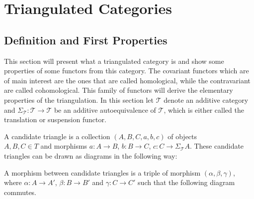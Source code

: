\chapter{Triangulated Categories}

\section{Definition and First Properties}
    This section will present what a triangulated category is and show some properties of some functors from this category. The covariant functors which are of main interest are the ones that are called homological, while the contravariant are called cohomological. This family of functors will derive the elementary properties of the triangulation. In this section let $\mathcal{T}$ denote an additive category and $\Sigma_{\mathcal{T}}:\mathcal{T}\rightarrow\mathcal{T}$ be an additive autoequivalence of $\mathcal{T}$, which is either called the translation or suspension functor.
    
    \begin{definition}
        A candidate triangle is a collection $(A,B,C,a,b,c)$ of objects \\ $A,B,C\in T$ and morphisms $a:A\rightarrow B$, $b:B\rightarrow C$, $c:C\rightarrow \Sigma_{\mathcal{T}}A$. These candidate triangles can be drawn as diagrams in the following way:

        \begin{center}
        \end{center}

        A morphism between candidate triangles is a triple of morphism $(\alpha, \beta, \gamma)$, where $\alpha : A \rightarrow A'$, $\beta : B \rightarrow B'$ and $\gamma : C \rightarrow C'$ such that the following diagram commutes.

    \begin{center}
    \end{center}

    \end{definition}


